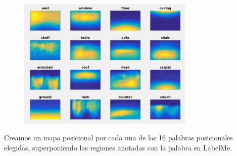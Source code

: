 \documentclass[compress]{beamer}
\begin{document}
\begin{frame}
\begin{figure}
\begin{center}
\includegraphics[width=0.75\textwidth]{images/labelme-global-features-without-horizon.png} 
\end{center}
\end{figure}

{\small Creamos un mapa posicional por cada una de las 16 palabras posicionales elegidas, superponiendo las regiones anotadas con la palabra en LabelMe.}
\end{frame}
\end{document}
